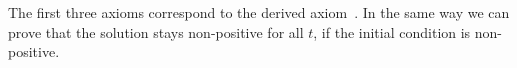 \begin{sequentdeduction}
{{{                            \land
                            \land
                        }
                    }{
                        \limply
                        \land
                    }    
                }{
                    \limply
                }
            \end{sequentdeduction}
            \normalsize
            The first three axioms correspond to the derived axiom~.
            In the same way we can prove that the solution stays non-positive for all $t$, if the initial condition is non-positive.


